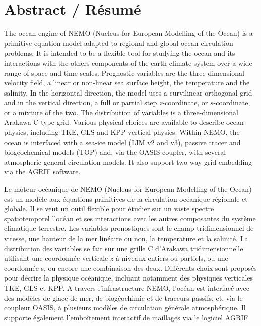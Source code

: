 

\chapter*{Abstract / R\'{e}sum\'{e}}

\vspace{-40pt}

{\small
The ocean engine of NEMO (Nucleus for European Modelling of the Ocean) is a primitive 
equation model adapted to regional and global ocean circulation problems. It is intended to 
be a flexible tool for studying the ocean and its interactions with the others components of 
the earth climate system over a wide range of space and time scales. 
Prognostic variables are the three-dimensional velocity field, a linear 
or non-linear sea surface height, the temperature and the salinity. In the horizontal direction, 
the model uses a curvilinear orthogonal grid and in the vertical direction, a full or partial step 
$z$-coordinate, or $s$-coordinate, or a mixture of the two. The distribution of variables is a 
three-dimensional Arakawa C-type grid. Various physical choices are available to describe 
ocean physics, including TKE, GLS and KPP vertical physics. Within NEMO, the ocean is 
interfaced with a sea-ice model (LIM v2 and v3), passive tracer and biogeochemical models (TOP) 
and, via the OASIS coupler, with several atmospheric general circulation models. It also 
support two-way grid embedding via the AGRIF software.

 \vspace{0.5cm}

Le moteur oc\'{e}anique de NEMO (Nucleus for European Modelling of the Ocean) est un 
mod\`{e}le aux \'{e}quations primitives de la circulation oc\'{e}anique r\'{e}gionale et globale. 
Il se veut un outil flexible pour \'{e}tudier sur un vaste spectre spatiotemporel l'oc\'{e}an et ses 
interactions avec les autres composantes du syst\`{e}me climatique terrestre. 
Les variables pronostiques sont le champ tridimensionnel de vitesse, une hauteur de la mer 
lin\'{e}aire ou non, la temperature et la salinit\'{e}. 
La distribution des variables se fait sur une grille C d'Arakawa tridimensionnelle utilisant une 
coordonn\'{e}e verticale $z$ \`{a} niveaux entiers ou partiels, ou une coordonn\'{e}e s, ou encore 
une combinaison des deux. Diff\'{e}rents choix sont propos\'{e}s pour d\'{e}crire la physique 
oc\'{e}anique, incluant notamment des physiques verticales TKE, GLS et KPP. A travers l'infrastructure 
NEMO, l'oc\'{e}an est interfac\'{e} avec des mod\`{e}les de glace de mer, de biog\'{e}ochimie 
et de traceurs passifs, et, via le coupleur OASIS, \`{a} plusieurs mod\`{e}les de circulation 
g\'{e}n\'{e}rale atmosph\'{e}rique. Il supporte \'{e}galement l'embo\^{i}tement interactif de 
maillages via le logiciel AGRIF.
} 

